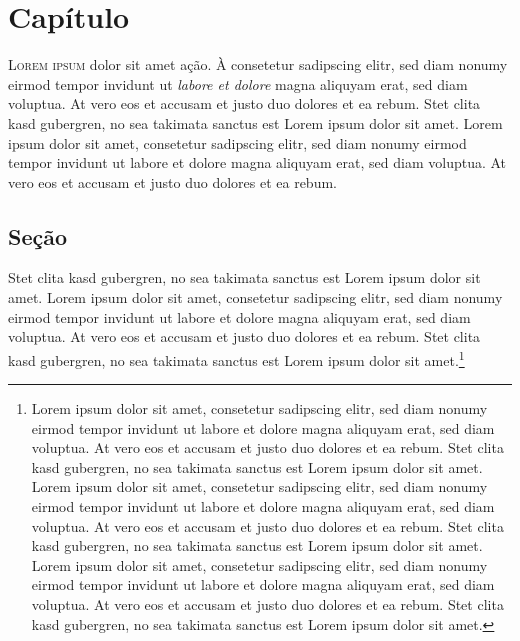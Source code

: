 
\chapter{Capítulo}


\textsc{Lorem ipsum} dolor sit amet ação. À consetetur sadipscing elitr, sed diam nonumy eirmod
tempor invidunt ut \textit{labore et dolore} magna aliquyam erat, sed diam voluptua. At
vero eos et accusam et justo duo dolores et ea rebum. Stet clita kasd
gubergren, no sea takimata sanctus est Lorem ipsum dolor sit amet. Lorem ipsum
dolor sit amet, consetetur sadipscing elitr, sed diam nonumy eirmod tempor
invidunt ut labore et dolore magna aliquyam erat, sed diam voluptua. At vero
eos et accusam et justo duo dolores et ea rebum.


\section{Seção}

Stet clita kasd gubergren, no
sea takimata sanctus est Lorem ipsum dolor sit amet. Lorem ipsum dolor sit
amet, consetetur sadipscing elitr, sed diam nonumy eirmod tempor invidunt ut
labore et dolore magna aliquyam erat, sed diam voluptua. At vero eos et accusam
et justo duo dolores et ea rebum. Stet clita kasd gubergren, no sea takimata
sanctus est Lorem ipsum dolor sit amet.\footnote{Lorem ipsum dolor sit amet,
      consetetur sadipscing elitr, sed diam nonumy eirmod tempor invidunt ut
      labore et dolore magna aliquyam erat, sed diam voluptua. At vero eos et accusam
      et justo duo dolores et ea rebum. Stet clita kasd gubergren, no sea takimata
      sanctus est Lorem ipsum dolor sit amet. Lorem ipsum dolor sit amet, consetetur
      sadipscing elitr, sed diam nonumy eirmod tempor invidunt ut labore et dolore
      magna aliquyam erat, sed diam voluptua. At vero eos et accusam et justo duo
      dolores et ea rebum. Stet clita kasd gubergren, no sea takimata sanctus est
      Lorem ipsum dolor sit amet. Lorem ipsum dolor sit amet, consetetur sadipscing
      elitr, sed diam nonumy eirmod tempor invidunt ut labore et dolore magna
      aliquyam erat, sed diam voluptua. At vero eos et accusam et justo duo dolores
      et ea rebum. Stet clita kasd gubergren, no sea takimata sanctus est Lorem ipsum
      dolor sit amet.}


